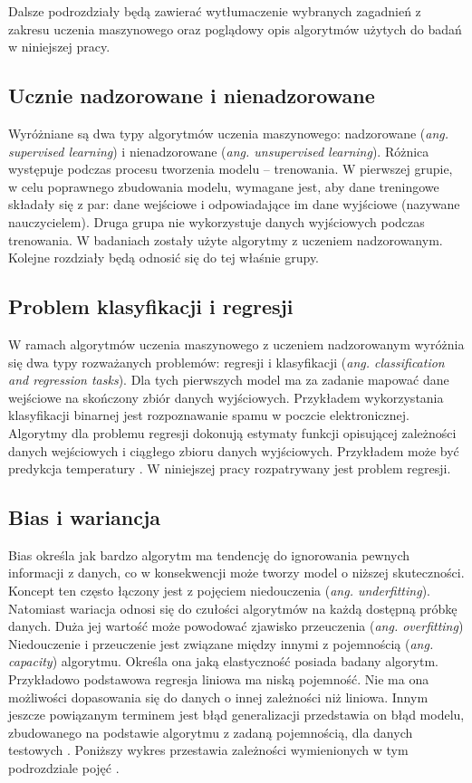 Dalsze  podrozdziały będą zawierać wytłumaczenie wybranych zagadnień z zakresu uczenia maszynowego oraz poglądowy opis algorytmów użytych do badań w niniejszej pracy.

\subsection{Ucznie nadzorowane i nienadzorowane}
Wyróżniane są dwa typy algorytmów uczenia maszynowego: nadzorowane ({\em ang. supervised learning}) i nienadzorowane ({\em ang. unsupervised learning}). Różnica występuje podczas procesu tworzenia modelu -- trenowania. W pierwszej grupie, w celu poprawnego zbudowania modelu, wymagane jest, aby dane treningowe składały się z par: dane wejściowe i odpowiadające im  dane wyjściowe (nazywane nauczycielem). Druga grupa nie wykorzystuje danych wyjściowych podczas trenowania. W badaniach zostały użyte algorytmy z uczeniem nadzorowanym. Kolejne rozdziały będą odnosić się do tej właśnie grupy. \par 

\subsection{Problem klasyfikacji i regresji}
W ramach algorytmów uczenia maszynowego z uczeniem nadzorowanym wyróżnia się dwa typy rozważanych  problemów: regresji i klasyfikacji (\textit{ang. classification and regression tasks}). Dla tych pierwszych model ma za zadanie mapować dane wejściowe na skończony zbiór danych wyjściowych. Przykładem wykorzystania klasyfikacji binarnej jest rozpoznawanie spamu w poczcie elektronicznej. Algorytmy dla problemu regresji dokonują estymaty funkcji opisującej zależności danych wejściowych i ciągłego zbioru danych wyjściowych. Przykładem może być predykcja temperatury \cite{rf2}.
W niniejszej  pracy rozpatrywany  jest problem regresji. \par

\subsection{Bias i wariancja}
Bias określa jak bardzo algorytm ma tendencję do ignorowania pewnych informacji z danych, co w konsekwencji może tworzy model o niższej skuteczności. Koncept ten często łączony jest z pojęciem niedouczenia (\textit{ang. underfitting}). Natomiast wariacja odnosi się do czułości algorytmów na każdą dostępną próbkę danych. Duża jej wartość może powodować zjawisko przeuczenia (\textit{ang. overfitting})  Niedouczenie i przeuczenie jest związane między innymi z pojemnością (\textit{ang. capacity}) algorytmu. Określa ona jaką elastyczność posiada badany algorytm. Przykładowo podstawowa regresja liniowa ma niską pojemność. Nie ma ona możliwości dopasowania się do danych o innej zależności niż liniowa. Innym jeszcze powiązanym terminem jest błąd generalizacji przedstawia on błąd modelu, zbudowanego na podstawie algorytmu z zadaną pojemnością, dla danych testowych . Poniższy wykres przestawia zależności wymienionych w tym podrozdziale pojęć \cite{mit_deep_learning}.

